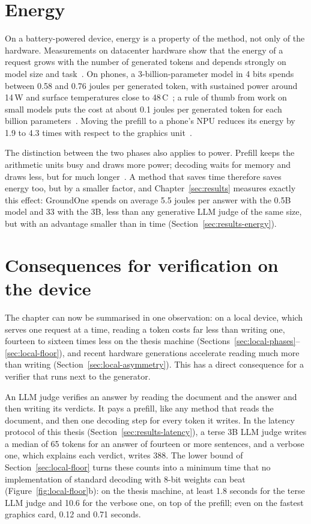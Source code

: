 \section{Energy}
\label{sec:local-energy}

On a battery-powered device, energy is a property of the method, not only of the hardware. Measurements on datacenter
hardware show that the energy of a request grows with the number of generated tokens and depends strongly on model size
and task~\cite{samsi2023words,luccioni2024power}. On phones, a 3-billion-parameter model in 4 bits spends between 0.58 and
0.76 joules per generated token, with sustained power around 14\,W and surface temperatures close to
48\,\textdegree C~\cite{laskaridis2024melting}; a rule of thumb from work on small models puts the cost at about 0.1 joules
per generated token for each billion parameters~\cite{liu2024mobilellm}. Moving the prefill to a phone's NPU
reduces its energy by 1.9 to 4.3 times with respect to the graphics unit~\cite{xu2025npu}.

The distinction between the two phases also applies to power. Prefill keeps the arithmetic units busy and draws more
power; decoding waits for memory and draws less, but for much longer~\cite{patel2024splitwise}. A method that
saves time therefore saves energy too, but by a smaller factor, and Chapter~\ref{sec:results} measures exactly this
effect: GroundOne spends on average 5.5 joules per answer with the 0.5B model and 33 with the 3B, less than any generative
LLM judge of the same size, but with an advantage smaller than in time (Section~\ref{sec:results-energy}).

\section{Consequences for verification on the device}
\label{sec:local-verification}

The chapter can now be summarised in one observation: on a local device, which serves one request at a time, reading a
token costs far less than writing one, fourteen to sixteen times less on the thesis machine
(Sections~\ref{sec:local-phases}--\ref{sec:local-floor}), and recent hardware generations accelerate reading much more
than writing (Section~\ref{sec:local-asymmetry}). This has a direct consequence for a verifier that runs next to the generator.

An LLM judge verifies an answer by reading the document and the answer and then writing its verdicts. It pays a
prefill, like any method that reads the document, and then one decoding step for every token it writes. In the latency
protocol of this thesis (Section~\ref{sec:results-latency}), a terse 3B LLM judge writes a median of 65 tokens for an answer of
fourteen or more sentences, and a verbose one, which explains each verdict, writes 388. The lower bound of
Section~\ref{sec:local-floor} turns these counts into a minimum time that no implementation of standard decoding with
8-bit weights can beat
(Figure~\ref{fig:local-floor}b): on the thesis machine, at least 1.8 seconds for the terse LLM judge and 10.6 for the verbose
one, on top of the prefill; even on the fastest graphics card, 0.12 and 0.71 seconds.


